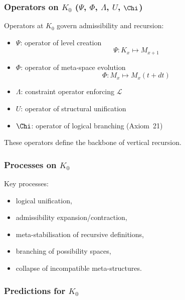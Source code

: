 \subsubsection{Operators on \texorpdfstring{$K_0$}{K_0} (\texorpdfstring{$\Psi$}{\Psi}, \texorpdfstring{$\Phi$}{\Phi}, \texorpdfstring{$\Lambda$}{\Lambda}, \texorpdfstring{$U$}{U}, \texorpdfstring{$\Chi$}{\Chi})}

Operators at $K_0$ govern admissibility and recursion:

\begin{itemize}
    \item $\Psi$: operator of level creation  
          \[
          \Psi: K_x \mapsto M_{x+1}
          \]
    \item $\Phi$: operator of meta-space evolution  
          \[
          \Phi: M_x \mapsto M_x(t+dt)
          \]
    \item $\Lambda$: constraint operator enforcing $\mathcal{L}$
    \item $U$: operator of structural unification
    \item $\Chi$: operator of logical branching (Axiom~21)
\end{itemize}

These operators define the backbone of vertical recursion.

\subsubsection{Processes on \texorpdfstring{$K_0$}{K_0}}

Key processes:
\begin{itemize}
    \item logical unification,
    \item admissibility expansion/contraction,
    \item meta-stabilisation of recursive definitions,
    \item branching of possibility spaces,
    \item collapse of incompatible meta-structures.
\end{itemize}

\subsubsection{Predictions for \texorpdfstring{$K_0$}{K_0}}

